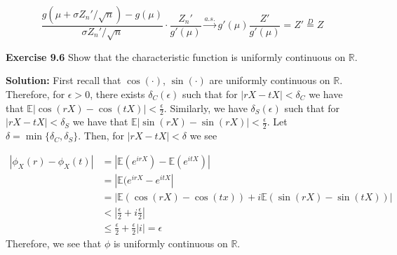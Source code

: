 \documentclass[12pt]{article}  %
\newcommand{\R}{{\mathbb{R}}}
\newcommand{\e}{{\epsilon}}
\newcommand{\E}{{\mathbb{E}}}
\begin{document}
$$\frac{g(\mu + \sigma Z_n'/\sqrt{n}) - g(\mu)}{\sigma Z_n'/\sqrt{n}}\cdot\frac{Z_n'}{g'(\mu)} \overset{a.s.}{\longrightarrow}g'(\mu)\frac{Z'}{g'(\mu)} = Z' \overset{D}{=}Z$$

\newpage 

\textbf{Exercise 9.6} Show that the characteristic function is uniformly continuous on $\R$. 

\textbf{Solution:} First recall that $\cos(\cdot)$, $\sin(\cdot)$ are uniformly continuous on $\R$. Therefore, for $\e>0$, there exists $\delta_C(\e)$ such that for $|rX - tX|<\delta_C$ we have that $\E|\cos(rX) - \cos(tX)|<\frac{\e}{2}$. Similarly, we have $\delta_S(\e)$ such that for $|rX - tX|<\delta_S$ we have that $\E|\sin(rX) - \sin(rX)|<\frac{\e}{2}$. Let $\delta = \min\{\delta_C, \delta_S\}$. Then, for $|rX - tX|<\delta$ we see 

\begin{align*}
|\phi_X(r) - \phi_X(t)| &= |\E(e^{irX}) - \E(e^{itX})|\\
&= |\E(e^{irX} - e^{itX}|\\
&= |\E(\cos(rX) - \cos(tx)) + i\E(\sin(rX) - \sin(tX))|\\
&< |\frac{\e}{2} + i\frac{\e}{2}|\\ 
&\leq \frac{\e}{2} + \frac{\e}{2}|i| = \e
\end{align*}
Therefore, we see that $\phi$ is uniformly continuous on $\R$. 
\end{document}
